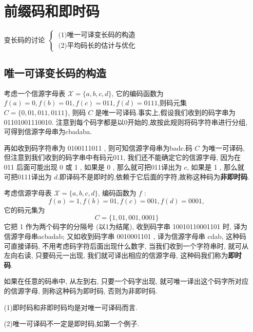 \section{前缀码和即时码}

变长码的讨论 $ \left\{\begin{array}{l}\text { (1)唯一可译变长码的构造 } \\ \text { (2)平均码长的估计与优化 }\end{array}\right. $

\subsection{唯一可译变长码的构造}
\begin{example}
    考虑一个信源字母表 $ \mathscr{X}=\{a, b, c, d\} $, 它的编码函数为 $ f(a)=0, f(b)=01, f(c)=011, f(d)=0111 $,则码元集 $ C=\{0,01,011,0111\} $, 则码 $ C $ 是唯一可译码.事实上,假设我们收到的码字串为 01101001110010. 注意到每个码字都是以0开始的,故按此规则将码字符串进行分组, 可得到信源字母串为cbadaba.

    再如收到码字符串为 0100111011 , 则可知信源字母串为badc.码 $ C $ 为唯一可译码, 但注意到我们收到的码字串中有码元011, 我们还不能确定它的信源字母, 因为在 011 后面可能出现 0 或 1 , 如果是 0 , 那么就可把011译出为 $ c $, 如果是 1 , 那么就可把0111译出为 $ d $.即译码不是即时的,依赖于它后面的字符,故称这种码为\textbf{非即时码}.
\end{example}

\begin{example}
 考虑信源字母表 $ \mathscr{X}=\{a, b, c, d\} $, 编码函数为 $ f $ :
$$
f(a)=1, f(b)=01, f(c)=001, f(d)=0001,
$$
它的码元集为
$$
C=\{1,01,001,0001\}
$$
它把 1 作为两个码字的分隔号 (以1为结尾), 收到码字串 10010110001101 时, 译为信源字母串acbadab; 又如收到码字串 0010001101 , 译为信源字母串 cdab, 这种码可直接译码, 不用考虑码字符后面出现什么数字, 当我们收到一个字符串时, 就可从左向右读, 只要码元一出现, 我们就可译出相应的信源字母, 这种码我们称为\textbf{即时码}.
\end{example}

\begin{definition}[即时码与非即时码]
    如果在任意的码串中, 从左到右, 只要一个码字出现, 就可唯一译出这个码字所对应的信源字母, 则称这种码为即时码, 否则为非即时码.
\end{definition}
\begin{remark}

    (1)即时码和非即时码均是对唯一可译码而言.
    
(2)唯一可译码不一定是即时码,如第一个例子.
\end{remark}

